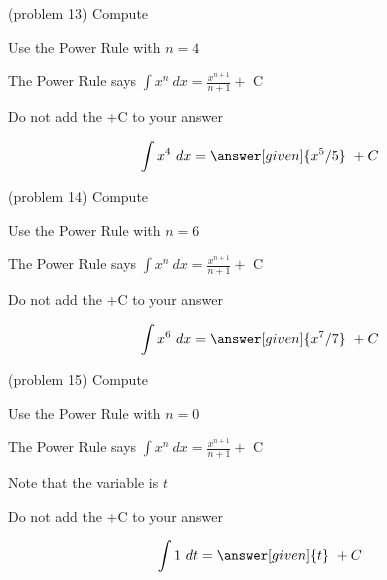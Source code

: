 \documentclass[handout]{ximera}
\begin{document}
\begin{problem}(problem 13)
Compute 

\begin{hint}
Use the Power Rule with $n=4$
\end{hint}
\begin{hint}
The Power Rule says $\int x^n \ dx = \frac{x^{n+1}}{n+1} +$ C
\end{hint}
\begin{hint}
\begin{center}
Do not add the +C to your answer
\end{center}
\end{hint}

\[
\int x^4 \ dx =
\answer[given]{x^5 /5} \ + C
\]
\end{problem}


\begin{problem}(problem 14)
Compute 

\begin{hint}
Use the Power Rule with $n=6$
\end{hint}
\begin{hint}
The Power Rule says $\int x^n \ dx = \frac{x^{n+1}}{n+1} +$ C
\end{hint}
\begin{hint}
\begin{center}
Do not add the +C to your answer
\end{center}
\end{hint}

\[
\int x^6 \ dx =
\answer[given]{x^7 /7} \ + C
\]
\end{problem}



\begin{problem}(problem 15)
Compute 


\begin{hint}
Use the Power Rule with $n=0$
\end{hint}
\begin{hint}
The Power Rule says $\int x^n \ dx = \frac{x^{n+1}}{n+1} +$ C
\end{hint}
\begin{hint}
Note that the variable is $t$
\end{hint}
\begin{hint}
\begin{center}
Do not add the +C to your answer
\end{center}
\end{hint}

\[
\int 1 \ dt =
\answer[given]{t} \ + C
\]
\end{problem}
\end{document}
